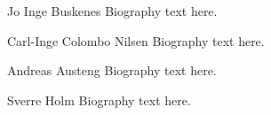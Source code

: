 \documentclass[12pt,journal,onecolumn]{IEEEtran}
\begin{document}
\begin{IEEEbiography}{Jo Inge Buskenes}
Biography text here.
\end{IEEEbiography}

\begin{IEEEbiography}{Carl-Inge Colombo Nilsen}
Biography text here.
\end{IEEEbiography}


\begin{IEEEbiography}{Andreas Austeng}
Biography text here.
\end{IEEEbiography}

\begin{IEEEbiography}{Sverre Holm}
Biography text here.
\end{IEEEbiography}







\end{document}
